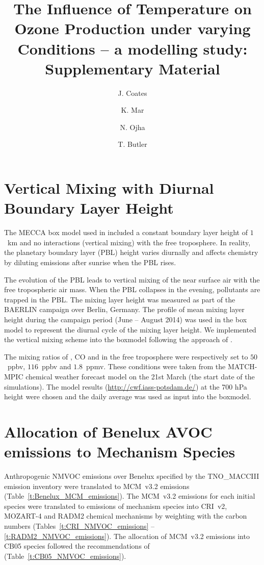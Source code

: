 \documentclass[11pt,a4paper]{article}
\title{The Influence of Temperature on Ozone Production under varying \ce{NO_x} Conditions -- a modelling study: Supplementary Material}
\author[1]{J. Coates}
\author[1]{K. Mar}
\author[2]{N. Ojha}
\author[1]{T. Butler}
\affil[1]{Institute for Advanced Sustainability Studies, Potsdam, Germany}
\affil[2]{Atmospheric Chemistry Department, Max Planck Institute for Chemistry, Mainz, Germany}
\begin{document}
\maketitle

\section{Vertical Mixing with Diurnal Boundary Layer Height} 
The MECCA box model used in \citet{Coates:2015} included a constant boundary layer height of $1$~km and no interactions (vertical mixing) with the free troposphere.
In reality, the planetary boundary layer (PBL) height varies diurnally and affects chemistry by diluting emissions after sunrise when the PBL rises. 

The evolution of the PBL leads to vertical mixing of the near surface air with the free tropospheric air mass. 
When the PBL collapses in the evening, pollutants are trapped in the PBL.  
The mixing layer height was measured as part of the BAERLIN campaign \citep{Bonn:2016} over Berlin, Germany. 
The profile of mean mixing layer height during the campaign period (June -- August 2014) was used in the box model to represent the diurnal cycle of the mixing layer height.
We implemented the vertical mixing scheme into the boxmodel following the approach of \citet{Lourens:2016}.

The mixing ratios of , CO and  in the free troposphere were respectively set to $50$~ppbv, $116$~ppbv and $1.8$~ppmv. 
These conditions were taken from the MATCH-MPIC chemical weather forecast model on the 21st March (the start date of the simulations). 
The model results (\url{http://cwf.iass-potsdam.de/}) at the 700 hPa height were chosen and the daily average was used as input into the boxmodel.

\section{Allocation of Benelux AVOC emissions to Mechanism Species}
Anthropogenic NMVOC emissions over Benelux specified by the TNO\_MACCIII emission inventory \citep{Kuenen:2014} were translated to MCM~v3.2 emissions (Table~\ref{t:Benelux_MCM_emissions}).
The MCM~v3.2 emissions for each initial species were translated to emissions of mechanism species into CRI~v2, MOZART-4 and RADM2 chemical mechanisms by weighting with the carbon numbers (Tables~\ref{t:CRI_NMVOC_emissions} -- \ref{t:RADM2_NMVOC_emissions}).
The allocation of MCM~v3.2 emissions into CB05 species followed the recommendations of \citet{Yarwood:2005} (Table~\ref{t:CB05_NMVOC_emissions}).
{
    \begin{landscape}%
        \centering%
        
    \end{landscape}%
}
\newpage
{
    \centering%
    
}
\newpage
{
    \centering%
    
}
\newpage
{
    \centering%
    
}
\newpage
{
    \centering%
    
}
\end{document}
